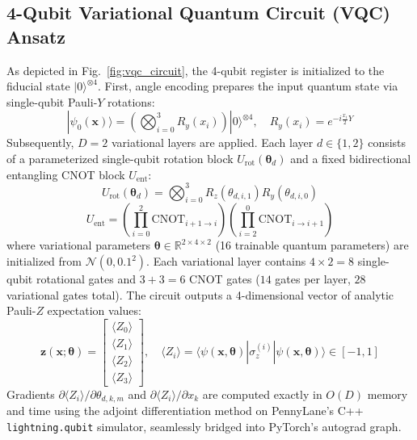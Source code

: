 \documentclass[conference]{IEEEtran}
\begin{document}
\subsection{4-Qubit Variational Quantum Circuit (VQC) Ansatz}
As depicted in Fig.~\ref{fig:vqc_circuit}, the 4-qubit register is initialized to the fiducial state $|0\rangle^{\otimes 4}$. First, angle encoding prepares the input quantum state via single-qubit Pauli-$Y$ rotations:
\begin{equation}
|\psi_0(\mathbf{x})\rangle = \left( \bigotimes_{i=0}^{3} R_y(x_i) \right) |0\rangle^{\otimes 4}, \quad R_y(x_i) = e^{-i \frac{x_i}{2} Y}
\end{equation}
Subsequently, $D=2$ variational layers are applied. Each layer $d \in \{1, 2\}$ consists of a parameterized single-qubit rotation block $U_{\text{rot}}(\boldsymbol{\theta}_d)$ and a fixed bidirectional entangling CNOT block $U_{\text{ent}}$:
\begin{equation}
U_{\text{rot}}(\boldsymbol{\theta}_d) = \bigotimes_{i=0}^{3} R_z(\theta_{d,i,1}) R_y(\theta_{d,i,0})
\end{equation}
\begin{equation}
U_{\text{ent}} = \left( \prod_{i=0}^{2} \text{CNOT}_{i+1 \to i} \right) \left( \prod_{i=2}^{0} \text{CNOT}_{i \to i+1} \right)
\end{equation}
where variational parameters $\boldsymbol{\theta} \in \mathbb{R}^{2 \times 4 \times 2}$ (16 trainable quantum parameters) are initialized from $\mathcal{N}(0, 0.1^2)$. Each variational layer contains $4 \times 2 = 8$ single-qubit rotational gates and $3 + 3 = 6$ CNOT gates ($14$ gates per layer, $28$ variational gates total). The circuit outputs a 4-dimensional vector of analytic Pauli-$Z$ expectation values:
\begin{equation}
\mathbf{z}(\mathbf{x}; \boldsymbol{\theta}) = \begin{bmatrix} \langle Z_0 \rangle \\ \langle Z_1 \rangle \\ \langle Z_2 \rangle \\ \langle Z_3 \rangle \end{bmatrix}, \quad \langle Z_i \rangle = \langle \psi(\mathbf{x}, \boldsymbol{\theta}) | \sigma_z^{(i)} | \psi(\mathbf{x}, \boldsymbol{\theta}) \rangle \in [-1, 1]
\end{equation}
Gradients $\partial \langle Z_i \rangle / \partial \theta_{d,k,m}$ and $\partial \langle Z_i \rangle / \partial x_k$ are computed exactly in $O(D)$ memory and time using the adjoint differentiation method \cite{jones2020efficient} on PennyLane's C++ \texttt{lightning.qubit} simulator, seamlessly bridged into PyTorch's autograd graph.
\end{document}
